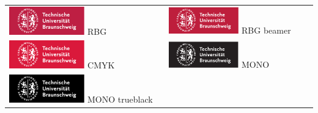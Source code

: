 \documentclass[a4paper,10pt,landscape]{tubsartcl}
\title{}
\author{}
\begin{document}
\begin{tabularx}{\textwidth}{@{}XX@{}}
\includegraphics[width=0.5\textwidth]{TUBraunschweig_RGB.pdf}\newline
RBG
&
\includegraphics[width=0.5\textwidth]{TUBraunschweig_RGB_beamer.pdf}\newline
RBG beamer
\\
\includegraphics[width=0.5\textwidth]{TUBraunschweig_4C.pdf}\newline
CMYK
&
\includegraphics[width=0.5\textwidth]{TUBraunschweig_B.pdf}\newline
MONO
\\
\includegraphics[width=0.5\textwidth]{TUBraunschweig_B_true.pdf}\newline
MONO trueblack
\end{tabularx}
\end{document}
